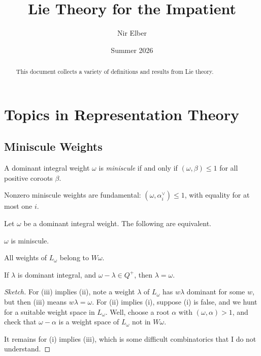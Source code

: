 \documentclass{article}
\title{Lie Theory for the Impatient}
\author{Nir Elber}
\date{Summer 2026}
\begin{document}
\maketitle

\begin{abstract}
	This document collects a variety of definitions and results from Lie theory.
\end{abstract}

\tableofcontents

\newpage

\section{Topics in Representation Theory}

\subsection{Miniscule Weights}
\begin{definition}[miniscule]
	A dominant integral weight $\omega$ is \textit{miniscule} if and only if $(\omega,\beta)\le1$ for all positive coroots $\beta$.
\end{definition}
\begin{remark}
	Nonzero miniscule weights are fundamental: $(\omega,\alpha_i^\lor)\le1$, with equality for at most one $i$.
\end{remark}
\begin{proposition}
	Let $\omega$ be a dominant integral weight. The following are equivalent.
	\begin{listroman}
		\item $\omega$ is miniscule.
		\item All weights of $L_\omega$ belong to $W\omega$.
		\item If $\lambda$ is dominant integral, and $\omega-\lambda\in Q^+$, then $\lambda=\omega$.
	\end{listroman}
\end{proposition}
\begin{proof}[Sketch]
	For (iii) implies (ii), note a weight $\lambda$ of $L_\omega$ has $w\lambda$ dominant for some $w$, but then (iii) means $w\lambda=\omega$. For (ii) implies (i), suppose (i) is false, and we hunt for a suitable weight space in $L_\omega$. Well, choose a root $\alpha$ with $(\omega,\alpha)>1$, and check that $\omega-\alpha$ is a weight space of $L_\omega$ not in $W\omega$.

	It remains for (i) implies (iii), which is some difficult combinatorics that I do not understand.\todo{}
\end{proof}
\end{document}
